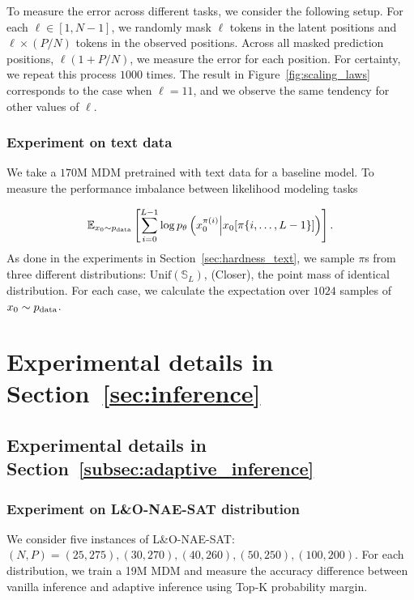 To measure the error across different tasks, we consider the following setup. For each $\ell \in [1, N-1]$, we randomly mask $\ell$ tokens in the latent positions and $\ell \times (P/N)$ tokens in the observed positions. Across all masked prediction positions, $\ell (1 + P/N)$, we measure the error for each position. For certainty, we repeat this process $1000$ times. The result in Figure~\ref{fig:scaling_laws} corresponds to the case when $\ell = 11$, and we observe the same tendency for other values of $\ell$.


\subsubsection{Experiment on text data}
We take a $170$M MDM pretrained with text data for a baseline model. To measure the performance imbalance between likelihood modeling tasks 

\begin{equation*}
    \mathbb{E}_{x_0 \sim p_{\rm{data}}}\left[\sum_{i=0}^{L-1} \log p_\theta \left( x_0^{\pi(i)} \Big| x_0 [\pi\{i,\ldots,L-1\}] \right) \right].
\end{equation*}
As done in the experiments in Section~\ref{sec:hardness_text}, we sample $\pi$s from 
three different distributions: $\mathrm{Unif}(\mathbb{S}_L)$, (Closer), the point mass of identical distribution. For each case, we calculate the expectation over $1024$ samples of $x_0 \sim p_{\rm{data}}$.


\section{Experimental details in Section~\ref{sec:inference}}

\subsection{Experimental details in Section~\ref{subsec:adaptive_inference}}
\label{appendix:exp_detail_inference}

\subsubsection{Experiment on L\&O-NAE-SAT distribution}
We consider five instances of L\&O-NAE-SAT: $(N,P) = (25,275), (30,270), (40,260), (50,250), (100,200)$. For each distribution, we train a 19M MDM and measure the accuracy difference between vanilla inference and adaptive inference using Top-K probability margin.

